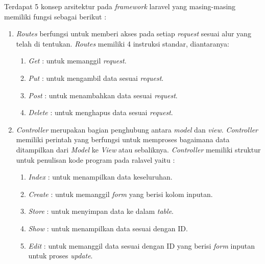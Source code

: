 Terdapat 5 konsep arsitektur pada \textit{framework} laravel yang masing-masing memiliki fungsi sebagai berikut \cite{6}:
\begin{enumerate}

\item \textit{Routes} berfungsi untuk memberi akses pada setiap \textit{request} sesuai alur yang telah di tentukan. \textit{Routes} memiliki 4 instruksi standar, diantaranya:

\begin{enumerate}

\item \textit{Get} \kern 1.5pc : untuk memanggil \textit{request}.

\item \textit{Put}	\kern 1.5pc : untuk mengambil data sesuai \textit{request}.

\item \textit{Post}	\kern 1.2pc : untuk menambahkan data sesuai \textit{request}.

\item \textit{Delete} \kern 0.3pc : untuk menghapus data sesuai \textit{request}.
\end{enumerate}

\item \textit{Controller} merupakan bagian penghubung antara \textit{model} dan \textit{view}. \textit{Controller} memiliki perintah yang berfungsi untuk memproses bagaimana data ditampilkan dari \textit{Model} ke \textit{View} atau sebaliknya. \textit{Controller} memiliki struktur untuk penulisan kode program pada ralavel yaitu :

\begin{enumerate}

\item \textit{Index} \kern 0.7pc : untuk menampilkan data keseluruhan.

\item \textit{Create} \kern 0.2pc : untuk memanggil \textit{form} yang berisi kolom inputan.

\item \textit{Store} \kern 0.8pc : untuk menyimpan data ke dalam \textit{table}.

\item \textit{Show} \kern 0.7pc : untuk menampilkan data sesuai dengan ID.

\item \textit{Edit} \kern 1.1pc : untuk memanggil data sesuai dengan ID yang berisi \textit{form} inputan untuk proses \textit{update}.


\end{enumerate}
\end{enumerate}
